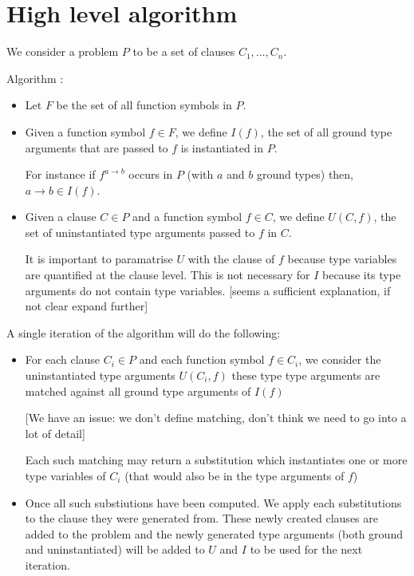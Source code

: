 \documentclass{article}
\begin{document}
\section{High level algorithm}

We consider a problem \(P\) to be a set of clauses \(C_1, \dots, C_n\).

Algorithm :
\begin{itemize}
    \item Let \(F\) be the set of all function symbols in \(P\).
    \item Given a function symbol \(f \in F\), we define \(I(f)\), the set of all ground type arguments that are passed to \(f\) is instantiated in \(P\).

    For instance if \(f^{a \rightarrow b}\) occurs in \(P\) (with \(a\) and \(b\) ground types) then, \(a \rightarrow b \in I(f) \).
 \item Given a clause \(C \in P\) and a function symbol \(f \in C\), we define \(U(C, f)\), the set of uninstantiated type arguments passed to \(f\) in \(C\). 

    It is important to paramatrise \(U\) with the clause of \(f\) because type variables are quantified at the clause level. This is not necessary for \(I\) because its type arguments do not contain type variables. [seems a sufficient explanation, if not clear expand further]

\end{itemize}

A single iteration of the algorithm will do the following:
\begin{itemize}
   \item For each clause \(C_i \in P\) and each function symbol \(f \in C_i\), we consider the uninstantiated type arguments \(U(C_i, f)\) these type type arguments are matched against all ground type arguments of \(I(f)\)

      [We have an issue: we don't define matching, don't think we need to go into a lot of detail]

      Each such matching may return a substitution which instantiates one or more type variables of \(C_i\) (that would also be in the type arguments of \(f\))

   \item Once all such substiutions have been computed. We apply each substitutions to the clause they were generated from. These newly created clauses are added to the problem and the newly generated type arguments (both ground and uninstantiated) will be added to \(U\) and \(I\) to be used for the next iteration.
\end{itemize}
\end{document}
